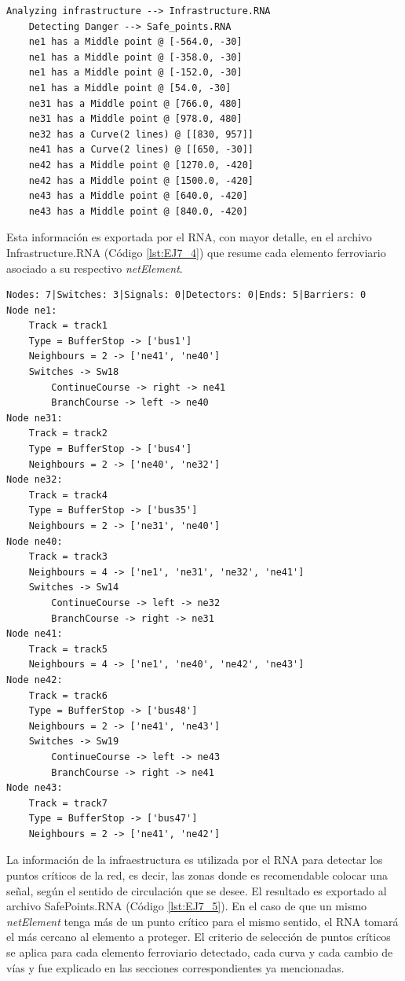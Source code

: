 	\begin{lstlisting}[language = {}, caption = Detección de puntos críticos por parte del RNA , label = {lst:EJ7_2}]
	Analyzing infrastructure --> Infrastructure.RNA
	Detecting Danger --> Safe_points.RNA
	ne1 has a Middle point @ [-564.0, -30]
	ne1 has a Middle point @ [-358.0, -30]
	ne1 has a Middle point @ [-152.0, -30]
	ne1 has a Middle point @ [54.0, -30]
	ne31 has a Middle point @ [766.0, 480]
	ne31 has a Middle point @ [978.0, 480]
	ne32 has a Curve(2 lines) @ [[830, 957]]
	ne41 has a Curve(2 lines) @ [[650, -30]]
	ne42 has a Middle point @ [1270.0, -420]
	ne42 has a Middle point @ [1500.0, -420]
	ne43 has a Middle point @ [640.0, -420]
	ne43 has a Middle point @ [840.0, -420]
	\end{lstlisting}
	
	Esta información es exportada por el RNA, con mayor detalle, en el archivo Infrastructure.RNA (Código \ref{lst:EJ7_4}) que resume cada elemento ferroviario asociado a su respectivo \textit{netElement}.
	
	\begin{lstlisting}[language = {}, caption = Infrastructure.RNA, label = {lst:EJ7_4}]
Nodes: 7|Switches: 3|Signals: 0|Detectors: 0|Ends: 5|Barriers: 0
Node ne1:
	Track = track1
	Type = BufferStop -> ['bus1']
	Neighbours = 2 -> ['ne41', 'ne40']
	Switches -> Sw18
		ContinueCourse -> right -> ne41
		BranchCourse -> left -> ne40
Node ne31:
	Track = track2
	Type = BufferStop -> ['bus4']
	Neighbours = 2 -> ['ne40', 'ne32']
Node ne32:
	Track = track4
	Type = BufferStop -> ['bus35']
	Neighbours = 2 -> ['ne31', 'ne40']
Node ne40:
	Track = track3
	Neighbours = 4 -> ['ne1', 'ne31', 'ne32', 'ne41']
	Switches -> Sw14
		ContinueCourse -> left -> ne32
		BranchCourse -> right -> ne31
Node ne41:
	Track = track5
	Neighbours = 4 -> ['ne1', 'ne40', 'ne42', 'ne43']
Node ne42:
	Track = track6
	Type = BufferStop -> ['bus48']
	Neighbours = 2 -> ['ne41', 'ne43']
	Switches -> Sw19
		ContinueCourse -> left -> ne43
		BranchCourse -> right -> ne41
Node ne43:
	Track = track7
	Type = BufferStop -> ['bus47']
	Neighbours = 2 -> ['ne41', 'ne42']
	\end{lstlisting}
	
	La información de la infraestructura es utilizada por el RNA para detectar los puntos críticos de la red, es decir, las zonas donde es recomendable colocar una señal, según el sentido de circulación que se desee. El resultado es exportado al archivo SafePoints.RNA (Código \ref{lst:EJ7_5}). En el caso de que un mismo \textit{netElement} tenga más de un punto crítico para el mismo sentido, el RNA tomará el más cercano al elemento a proteger. El criterio de selección de puntos críticos se aplica para cada elemento ferroviario detectado, cada curva y cada cambio de vías y fue explicado en las secciones correspondientes ya mencionadas.
	

